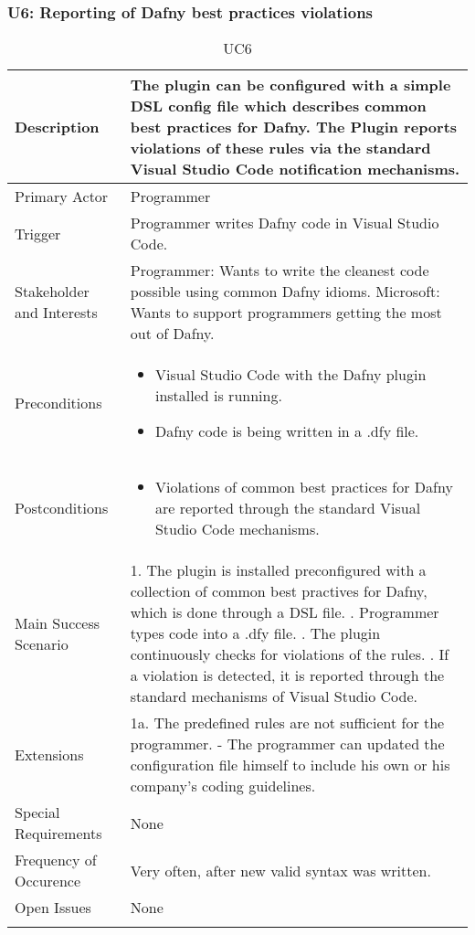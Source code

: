 \subsubsection{U6: Reporting of Dafny best practices violations}
\begin{longtable}{l | p{} }
	Description & The plugin can be configured with a simple DSL config file which describes common best practices for Dafny. The Plugin reports violations of these rules via the standard Visual Studio Code notification mechanisms.\\ \hline
	Primary Actor & Programmer\\ \hline
	Trigger & Programmer writes Dafny code in Visual Studio Code.\\ \hline
	Stakeholder and Interests & Programmer: Wants to write the cleanest code possible using common Dafny idioms. \newline Microsoft: Wants to support programmers getting the most out of Dafny.\\ \hline
	Preconditions &
	\begin{itemize}
		\item Visual Studio Code with the Dafny plugin installed is running.
		\item Dafny code is being written in a .dfy file.
	\end{itemize}\\ \hline
	Postconditions &
	\begin{itemize}
		\item Violations of common best practices for Dafny are reported through the standard Visual Studio Code mechanisms.
	\end{itemize}\\ \hline
	Main Success Scenario & 
	1. The plugin is installed preconfigured with a collection of common best practives for Dafny, which is done through a DSL file. \newline
	2. Programmer types code into a .dfy file. \newline 
	3. The plugin continuously checks for violations of the rules. \newline 
	4. If a violation is detected, it is reported through the standard mechanisms of Visual Studio Code.\\ \hline
	Extensions & 
	1a. The predefined rules are not sufficient for the programmer. \newline 
	- The programmer can updated the configuration file himself to include his own or his company's coding guidelines. \\ \hline
	Special Requirements & None\\ \hline
	Frequency of Occurence & Very often, after new valid syntax was written.\\ \hline
	Open Issues & None \\ \hline
	\caption{UC6}
\end{longtable}

